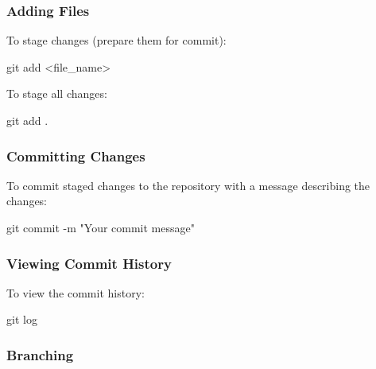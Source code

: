 \documentclass[
  letterpaper,
  DIV=11,
  numbers=noendperiod]{scrreprt}
\newenvironment{Shaded}{\begin{snugshade}}{\end{snugshade}}
\newcommand{\AttributeTok}[1]{\textcolor[rgb]{0.40,0.45,0.13}{#1}}
\newcommand{\FunctionTok}[1]{\textcolor[rgb]{0.28,0.35,0.67}{#1}}
\newcommand{\NormalTok}[1]{\textcolor[rgb]{0.00,0.23,0.31}{#1}}
\newcommand{\OperatorTok}[1]{\textcolor[rgb]{0.37,0.37,0.37}{#1}}
\newcommand{\StringTok}[1]{\textcolor[rgb]{0.13,0.47,0.30}{#1}}
\begin{document}
\subsubsection{Adding Files}\label{adding-files}

To stage changes (prepare them for commit):

\begin{Shaded}
\begin{Highlighting}[]
\FunctionTok{git}\NormalTok{ add }\OperatorTok{\textless{}}\NormalTok{file\_name}\OperatorTok{\textgreater{}}
\end{Highlighting}
\end{Shaded}

To stage all changes:

\begin{Shaded}
\begin{Highlighting}[]
\FunctionTok{git}\NormalTok{ add .}
\end{Highlighting}
\end{Shaded}

\subsubsection{Committing Changes}\label{committing-changes}

To commit staged changes to the repository with a message describing the
changes:

\begin{Shaded}
\begin{Highlighting}[]
\FunctionTok{git}\NormalTok{ commit }\AttributeTok{{-}m} \StringTok{"Your commit message"}
\end{Highlighting}
\end{Shaded}

\subsubsection{Viewing Commit History}\label{viewing-commit-history}

To view the commit history:

\begin{Shaded}
\begin{Highlighting}[]
\FunctionTok{git}\NormalTok{ log}
\end{Highlighting}
\end{Shaded}

\subsubsection{Branching}\label{branching}
\end{document}
